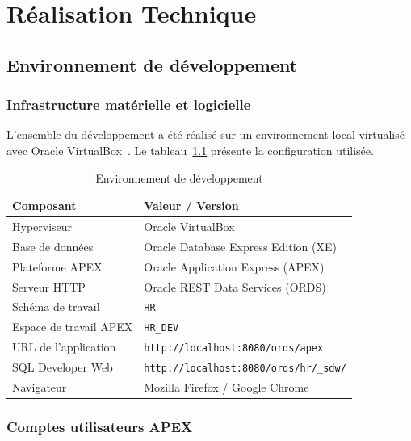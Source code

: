 \documentclass[12pt,a4paper,oneside]{report}
\begin{document}
\chapter{Réalisation Technique}
\label{chap:realisaton}

\section{Environnement de développement}

\subsection{Infrastructure matérielle et logicielle}

L'ensemble du développement a été réalisé sur un environnement local virtualisé avec Oracle VirtualBox~\cite{virtualbox}. Le tableau~\ref{tab:env} présente la configuration utilisée.

\begin{table}[H]
  \centering
  \caption{Environnement de développement}
  \begin{tabularx}{\linewidth}{@{}l X@{}}
    \toprule
    \textbf{Composant} & \textbf{Valeur / Version} \\
    \midrule
    Hyperviseur & Oracle VirtualBox \\
    Base de données & Oracle Database Express Edition (XE) \\
    Plateforme APEX & Oracle Application Express (APEX) \\
    Serveur HTTP & Oracle REST Data Services (ORDS) \\
    Schéma de travail & \texttt{HR} \\
    Espace de travail APEX & \texttt{HR\_DEV} \\
    URL de l'application & \texttt{http://localhost:8080/ords/apex} \\
    SQL Developer Web & \texttt{http://localhost:8080/ords/hr/\_sdw/} \\
    Navigateur & Mozilla Firefox / Google Chrome \\
    \bottomrule
  \end{tabularx}
  \label{tab:env}
\end{table}

\subsection{Comptes utilisateurs APEX}
\end{document}
